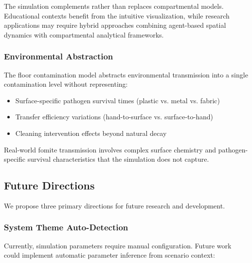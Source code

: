 The simulation complements rather than replaces compartmental models. Educational contexts benefit from the intuitive visualization, while research applications may require hybrid approaches combining agent-based spatial dynamics with compartmental analytical frameworks.

\subsubsection{Environmental Abstraction}

The floor contamination model abstracts environmental transmission into a single contamination level without representing:
\begin{itemize}
    \item Surface-specific pathogen survival times (plastic vs. metal vs. fabric)
    \item Transfer efficiency variations (hand-to-surface vs. surface-to-hand)
    \item Cleaning intervention effects beyond natural decay
\end{itemize}

Real-world fomite transmission involves complex surface chemistry and pathogen-specific survival characteristics that the simulation does not capture.

\subsection{Future Directions}

We propose three primary directions for future research and development.

\subsubsection{System Theme Auto-Detection}

Currently, simulation parameters require manual configuration. Future work could implement automatic parameter inference from scenario context:

